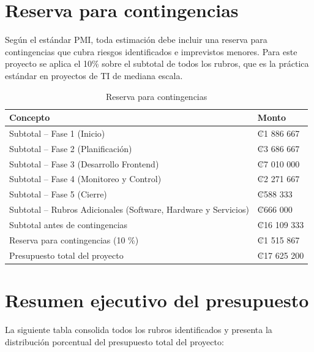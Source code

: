 \documentclass[11pt,spanish]{article}
\begin{document}
\section{Reserva para contingencias}

Según el estándar PMI, toda estimación debe incluir una reserva para contingencias que cubra riesgos identificados e imprevistos menores. Para este proyecto se aplica el 10\% sobre el subtotal de todos los rubros, que es la práctica estándar en proyectos de TI de mediana escala.

\begin{table}[H]
\centering
\caption{Reserva para contingencias}
\label{tab:reserva-contingencias}
\begin{tabularx}{\textwidth}{Y P{4cm}}
\toprule
\textbf{Concepto} & \textbf{Monto} \\
\midrule
Subtotal – Fase 1 (Inicio) & ₡1 886 667 \\
Subtotal – Fase 2 (Planificación) & ₡3 686 667 \\
Subtotal – Fase 3 (Desarrollo Frontend) & ₡7 010 000 \\
Subtotal – Fase 4 (Monitoreo y Control) & ₡2 271 667 \\
Subtotal – Fase 5 (Cierre) & ₡588 333 \\
Subtotal – Rubros Adicionales (Software, Hardware y Servicios) & ₡666 000 \\
Subtotal antes de contingencias & ₡16 109 333 \\
Reserva para contingencias (10 \%) & ₡1 515 867 \\
Presupuesto total del proyecto & ₡17 625 200 \\
\bottomrule
\end{tabularx}
\end{table}

\section{Resumen ejecutivo del presupuesto}

La siguiente tabla consolida todos los rubros identificados y presenta la distribución porcentual del presupuesto total del proyecto:
\end{document}
